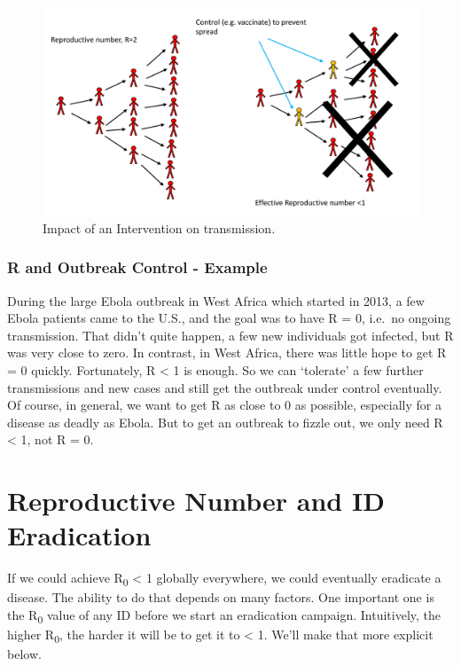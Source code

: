 \documentclass[]{book}
\theoremstyle{definition}
\theoremstyle{definition}
\theoremstyle{definition}
\theoremstyle{remark}
\begin{document}
\begin{figure}
\centering
\includegraphics{./images/R0intervention.pdf}
\caption{\label{fig:R0intervention}Impact of an Intervention on
transmission.}
\end{figure}

\subsubsection{R and Outbreak Control - Example}\label{myexamplebox}

During the large Ebola outbreak in West Africa which started in 2013, a
few Ebola patients came to the U.S., and the goal was to have R = 0,
i.e.~no ongoing transmission. That didn't quite happen, a few new
individuals got infected, but R was very close to zero. In contrast, in
West Africa, there was little hope to get R = 0 quickly. Fortunately, R
\textless{} 1 is enough. So we can `tolerate' a few further
transmissions and new cases and still get the outbreak under control
eventually. Of course, in general, we want to get R as close to 0 as
possible, especially for a disease as deadly as Ebola. But to get an
outbreak to fizzle out, we only need R \textless{} 1, not R = 0.

\section{Reproductive Number and ID
Eradication}\label{reproductive-number-and-id-eradication}

If we could achieve R\textsubscript{0} \textless{} 1 globally
everywhere, we could eventually eradicate a disease. The ability to do
that depends on many factors. One important one is the
R\textsubscript{0} value of any ID before we start an eradication
campaign. Intuitively, the higher R\textsubscript{0}, the harder it will
be to get it to \textless{} 1. We'll make that more explicit below.
\end{document}
